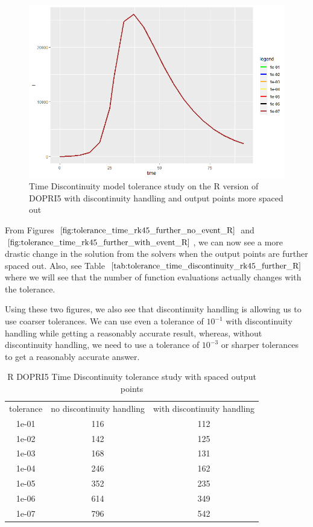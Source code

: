 \begin{figure}[h]
\centering
\includegraphics[width=0.7\linewidth]{./figures/tolerance_time_rk45_further_with_event_R}
\caption{Time Discontinuity model tolerance study on the R version of DOPRI5 with discontinuity handling and output points more spaced out}
\label{fig:tolerance_time_rk45_further_with_event_R}
\end{figure}

From Figures $\ref{fig:tolerance_time_rk45_further_no_event_R}$ and $\ref{fig:tolerance_time_rk45_further_with_event_R}$, we can now see a more drastic change in the solution from the solvers when the output points are further spaced out. Also, see Table $\ref{tab:tolerance_time_discontinuity_rk45_further_R}$ where we will see that the number of function evaluations actually changes with the tolerance.

Using these two figures, we also see that discontinuity handling is allowing us to use coarser tolerances. We can use even a tolerance of $10^{-1}$ with discontinuity handling while getting a reasonably accurate result, whereas, without discontinuity handling, we need to use a tolerance of $10^{-3}$ or sharper tolerances to get a reasonably accurate answer.

\begin{table}[h]
\caption {R DOPRI5 Time Discontinuity tolerance study with spaced output points} \label{tab:tolerance_time_discontinuity_rk45_further_R} 
\begin{center}
\begin{tabular}{ c c c }
tolerance & no discontinuity handling & with discontinuity handling \\ 
1e-01 & 116 & 112 \\
1e-02 & 142 & 125 \\
1e-03 & 168 & 131 \\
1e-04 & 246 & 162 \\
1e-05 & 352 & 235 \\
1e-06 & 614 & 349 \\
1e-07 & 796 & 542 \\
\end{tabular}
\end{center}
\end{table}

